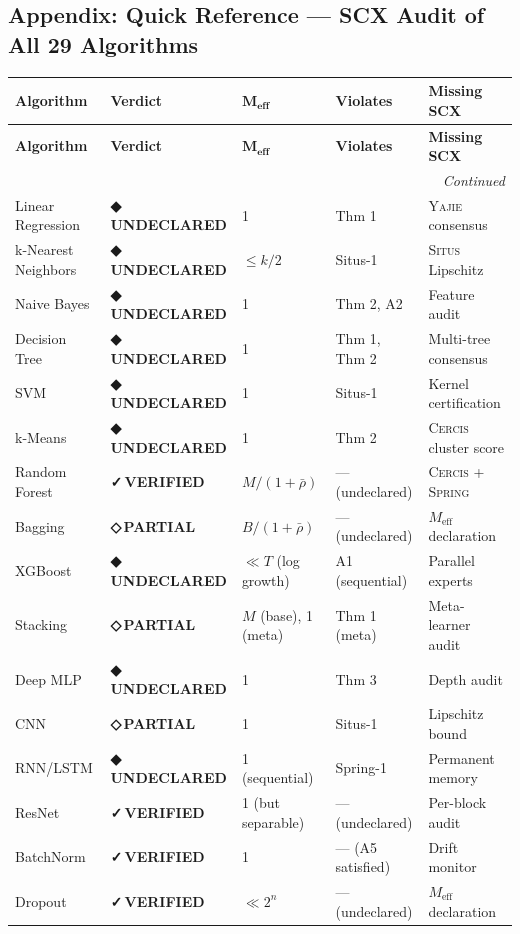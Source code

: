 \documentclass[12pt,a4paper]{article}
\theoremstyle{definition}
\newcommand{\guilty}{{\color{guiltycolor}\textbf{◆\,UNDECLARED}}}
\newcommand{\weakness}{{\color{weakcolor}\textbf{◇\,PARTIAL}}}
\newcommand{\verified}{{\color{verifiedcolor}\textbf{✓\,VERIFIED}}}
\newcommand{\Situs}{\textsc{Situs}}
\newcommand{\Yajie}{\textsc{Yajie}}
\newcommand{\Spring}{\textsc{Spring}}
\newcommand{\Cercis}{\textsc{Cercis}}
\begin{document}
\subsection{Appendix: Quick Reference — SCX Audit of All 29 Algorithms }

\begin{longtable}{p{3.2cm} p{1.2cm} p{1.2cm} p{2cm} p{3cm}}
\toprule
\textbf{Algorithm} & \textbf{Verdict} & $\boldsymbol{M_{\textbf{eff}}}$ & \textbf{Violates} & \textbf{Missing SCX} \\
\midrule
\endfirsthead
\toprule
\textbf{Algorithm} & \textbf{Verdict} & $\boldsymbol{M_{\textbf{eff}}}$ & \textbf{Violates} & \textbf{Missing SCX} \\
\midrule
\endhead
\midrule
\multicolumn{5}{r}{\textit{Continued}} \\
\endfoot
\bottomrule
\endlastfoot
Linear Regression & \guilty{} & 1 & Thm 1 & \Yajie{} consensus \\
k-Nearest Neighbors & \guilty{} & $\le k/2$ & Situs-1 & \Situs{} Lipschitz \\
Naive Bayes & \guilty{} & 1 & Thm 2, A2 & Feature audit \\
Decision Tree & \guilty{} & 1 & Thm 1, Thm 2 & Multi-tree consensus \\
SVM & \guilty{} & 1 & Situs-1 & Kernel certification \\
k-Means & \guilty{} & 1 & Thm 2 & \Cercis{} cluster score \\
Random Forest & \verified{} & $M/(1+\bar{\rho})$ & — (undeclared) & \Cercis{} + \Spring{} \\
Bagging & \weakness{} & $B/(1+\bar{\rho})$ & — (undeclared) & $M_{\text{eff}}$ declaration \\
XGBoost & \guilty{} & $\ll T$ (log growth) & A1 (sequential) & Parallel experts \\
Stacking & \weakness{} & $M$ (base), 1 (meta) & Thm 1 (meta) & Meta-learner audit \\
Deep MLP & \guilty{} & 1 & Thm 3 & Depth audit \\
CNN & \weakness{} & 1 & Situs-1 & Lipschitz bound \\
RNN/LSTM & \guilty{} & 1 (sequential) & Spring-1 & Permanent memory \\
ResNet & \verified{} & 1 (but separable) & — (undeclared) & Per-block audit \\
BatchNorm & \verified{} & 1 & — (A5 satisfied) & Drift monitor \\
Dropout & \verified{} & $\ll 2^n$ & — (undeclared) & $M_{\text{eff}}$ declaration \\

\end{longtable}
\end{document}
